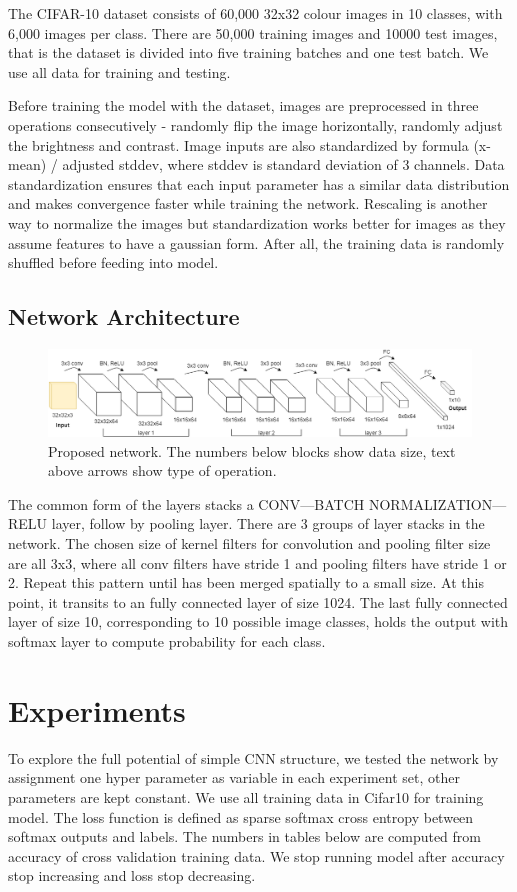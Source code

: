 \documentclass[journal,onecolumn, 12pt]{IEEEtran}
\begin{document}
The CIFAR-10 dataset consists of 60,000 32x32 colour images in 10 classes, with 6,000 images per class. There are 50,000 training images and 10000 test images, that is the dataset is divided into five training batches and one test batch. We use all data for training and testing.

Before training the model with the dataset, images are preprocessed in three operations consecutively - randomly flip the image horizontally, randomly adjust the brightness and contrast. Image inputs are also standardized by formula (x-mean) / adjusted stddev, where stddev is standard deviation of 3 channels. Data standardization ensures that each input parameter has a similar data distribution and makes convergence faster while training the network. Rescaling is another way to normalize the images but standardization works better for images as they assume features to have a gaussian form. After all, the training data is randomly shuffled before feeding into model.

\subsection{Network Architecture}

\begin{figure}[!t]
\includegraphics[width=0.8\paperwidth]{images/our_net}
\caption{Proposed network. The numbers below blocks show data size, text above arrows show type of operation.}
\end{figure}


The common form of the layers stacks a CONV---BATCH NORMALIZATION---RELU layer, follow by pooling layer. There are 3 groups of layer stacks in the network. The chosen size of kernel filters for convolution and pooling filter size are all 3x3, where all conv filters have stride 1 and pooling filters have stride 1 or 2. Repeat this pattern until has been merged spatially to a small size. At this point, it transits to an fully connected layer of size 1024. The last fully connected layer of size 10, corresponding to 10 possible image classes, holds the output with softmax layer to compute probability for each class.


\section{Experiments}
To explore the full potential of simple CNN structure, we tested the network by assignment one hyper parameter as variable in each experiment set, other parameters are kept constant. We use all training data in Cifar10 for training model. The loss function is defined as sparse softmax cross  entropy between softmax outputs and labels. The numbers in tables below are computed from accuracy of cross validation training data. We stop running model after accuracy stop increasing and loss stop decreasing.
\end{document}
